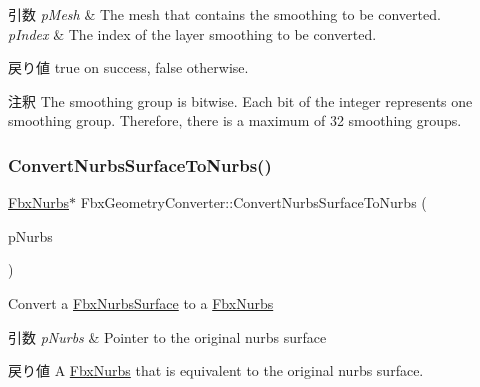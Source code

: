 \begin{DoxyParams}{引数}
{\em p\+Mesh} & The mesh that contains the smoothing to be converted. \\
\hline
{\em p\+Index} & The index of the layer smoothing to be converted. \\
\hline
\end{DoxyParams}
\begin{DoxyReturn}{戻り値}
{\ttfamily true} on success, {\ttfamily false} otherwise. 
\end{DoxyReturn}
\begin{DoxyRemark}{注釈}
The smoothing group is bitwise. Each bit of the integer represents one smoothing group. Therefore, there is a maximum of 32 smoothing groups. 
\end{DoxyRemark}
\mbox{\label{class_fbx_geometry_converter_aeccff6de5e2abd1f8625147b5e061b8b}} 
\subsubsection{\texorpdfstring{Convert\+Nurbs\+Surface\+To\+Nurbs()}{ConvertNurbsSurfaceToNurbs()}}
{\footnotesize\ttfamily \hyperlink{class_fbx_nurbs}{Fbx\+Nurbs}$\ast$ Fbx\+Geometry\+Converter\+::\+Convert\+Nurbs\+Surface\+To\+Nurbs (\begin{DoxyParamCaption}\item[{\hyperlink{class_fbx_nurbs_surface}{Fbx\+Nurbs\+Surface} $\ast$}]{p\+Nurbs }\end{DoxyParamCaption})}

Convert a \hyperlink{class_fbx_nurbs_surface}{Fbx\+Nurbs\+Surface} to a \hyperlink{class_fbx_nurbs}{Fbx\+Nurbs} 
\begin{DoxyParams}{引数}
{\em p\+Nurbs} & Pointer to the original nurbs surface \\
\hline
\end{DoxyParams}
\begin{DoxyReturn}{戻り値}
A \hyperlink{class_fbx_nurbs}{Fbx\+Nurbs} that is equivalent to the original nurbs surface. 
\end{DoxyReturn}
\mbox{\label{class_fbx_geometry_converter_a82c9ea1ab75c8eefd555b4c538f3bbb7}} 
